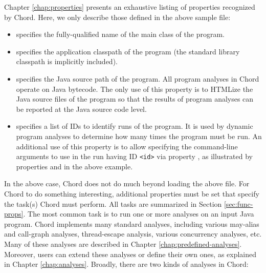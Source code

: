 Chapter \ref{chap:properties} presents an exhaustive listing of
properties recognized by Chord.  Here, we only describe those defined
in the above sample  file:

\begin{itemize}
\item
{} specifies the fully-qualified name of the main
class of the program.
\item
{} specifies the application classpath
of the program (the standard library classpath is implicitly
included).
\item
{} specifies the Java source path of the program.
All program analyses in Chord operate on Java bytecode.  The only use
of this property is to HTMLize the Java source files of the program so
that the results of program analyses can be reported at the Java
source code level.
\item
{} specifies a list of IDs to identify runs of the
program.  It is used by dynamic program analyses to determine how many
times the program must be run.  An additional use of this property is
to allow specifying the command-line arguments to use in the run
having ID {\tt <id>} via property , as
illustrated by properties  and 
in the above example.
\end{itemize}

In the above case, Chord does not do much beyond loading the above
 file.  For Chord to do something interesting,
additional properties must be set that specify the task(s)
Chord must perform.  All tasks are summarized in Section \ref{sec:func-props}.
The most common task is to run one or more analyses on an input Java program.
Chord implements many standard analyses, including various may-alias and
call-graph analyses, thread-escape analysis, various concurrency analyses,
etc. Many of these analyses are described in Chapter \ref{chap:predefined-analyses}.
Moreover, users can extend these analyses or define their own ones, as
explained in Chapter \ref{chap:analyses}.
Broadly, there are two kinds of analyses in Chord:

